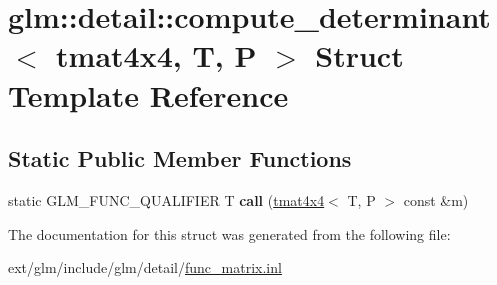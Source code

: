 \hypertarget{structglm_1_1detail_1_1compute__determinant_3_01tmat4x4_00_01_t_00_01_p_01_4}{\section{glm\-:\-:detail\-:\-:compute\-\_\-determinant$<$ tmat4x4, T, P $>$ Struct Template Reference}
\label{structglm_1_1detail_1_1compute__determinant_3_01tmat4x4_00_01_t_00_01_p_01_4}
}
\subsection*{Static Public Member Functions}
\begin{DoxyCompactItemize}
\item 
\hypertarget{structglm_1_1detail_1_1compute__determinant_3_01tmat4x4_00_01_t_00_01_p_01_4_a2a40ca25a8521c5048e1b5282ae93e00}{static G\-L\-M\-\_\-\-F\-U\-N\-C\-\_\-\-Q\-U\-A\-L\-I\-F\-I\-E\-R T {\bfseries call} (\hyperlink{structglm_1_1tmat4x4}{tmat4x4}$<$ T, P $>$ const \&m)}\label{structglm_1_1detail_1_1compute__determinant_3_01tmat4x4_00_01_t_00_01_p_01_4_a2a40ca25a8521c5048e1b5282ae93e00}

\end{DoxyCompactItemize}


The documentation for this struct was generated from the following file\-:\begin{DoxyCompactItemize}
\item 
ext/glm/include/glm/detail/\hyperlink{func__matrix_8inl}{func\-\_\-matrix.\-inl}\end{DoxyCompactItemize}
